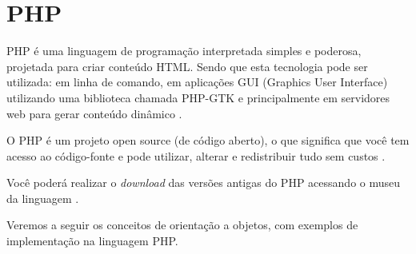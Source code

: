 \chapter{PHP}
\label{php}

PHP é uma linguagem de programação interpretada simples e poderosa, projetada 
para criar conteúdo HTML. Sendo que esta tecnologia pode ser utilizada: em 
linha de comando, em aplicações GUI (Graphics User Interface) utilizando uma 
biblioteca chamada PHP-GTK e principalmente em servidores web para gerar 
conteúdo dinâmico \cite{programmingPhp}.

O PHP é um projeto open source (de código aberto), o que significa que você tem
acesso ao código-fonte e pode utilizar, alterar e redistribuir tudo sem custos
\cite{phpAndMysqlWebDevelopment}.

Você poderá realizar o \textit{download} das versões antigas do
\acs{PHP} acessando o museu da linguagem \cite{websitePHPMuseum}.

Veremos a seguir os conceitos de orientação a objetos, com exemplos de
implementação na linguagem \acs{PHP}.
